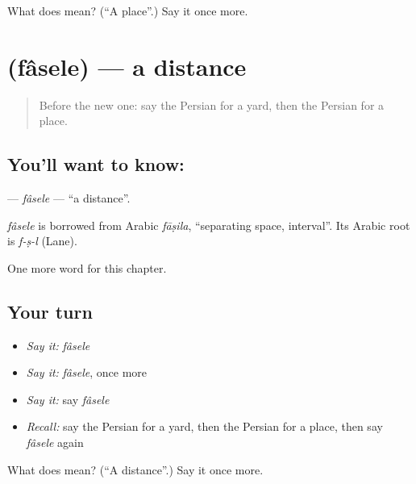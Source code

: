 \begin{tcolorbox}[breakable,colback=teal!4,colframe=teal!35!black,title={Before you move on}]
What does  mean? (\textquotedblleft{}A place\textquotedblright{}.) Say it once more.
\end{tcolorbox}
\section[\texorpdfstring{\fa{فاصله} (fâsele)}{فاصله (fâsele)}]{ (fâsele) — a distance}

\label{lesson:FA-C193-fasele}



\begin{quote}
Before the new one: say the Persian for a yard, then the Persian for a place.
\end{quote}

\subsection*{You'll want to know: }
\textbf{} — \emph{fâsele} — \textquotedblleft{}a distance\textquotedblright{}.

\begin{cousinweb}
\emph{fâsele} is borrowed from Arabic \emph{fāṣila}, \textquotedblleft{}separating space, interval\textquotedblright{}. Its Arabic root is \emph{f-ṣ-l} (Lane).
\end{cousinweb}

\begin{grammarlens}[title={What you've built}]
One more word for this chapter.
\end{grammarlens}

\subsection*{Your turn}
\begin{itemize}
\raggedright
  \item \emph{Say it:} \emph{fâsele}
  \item \emph{Say it:} \emph{fâsele}, once more
  \item \emph{Say it:} say \emph{fâsele}
  \item \emph{Recall:} say the Persian for a yard, then the Persian for a place, then say \emph{fâsele} again
\end{itemize}

\begin{tcolorbox}[breakable,colback=teal!4,colframe=teal!35!black,title={Before you move on}]
What does  mean? (\textquotedblleft{}A distance\textquotedblright{}.) Say it once more.
\end{tcolorbox}
